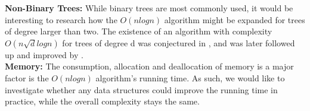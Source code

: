 \noindent\textbf{Non-Binary Trees:} While binary trees are most commonly used, it would be interesting to research how the $O(nlogn)$ algorithm might be expanded for trees of degree larger than two. The existence of an algorithm with complexity $O(n\sqrt{d}logn)$ for trees of degree d was conjectured in \cite{nlogn}, and was later followed up and improved by \cite{FastMatch}. \\

\noindent\textbf{Memory:} The consumption, allocation and deallocation of memory is a major factor is the $O(nlogn)$ algorithm's running time. As such, we would like to investigate whether any data structures could improve the running time in practice, while the overall complexity stays the same. 
